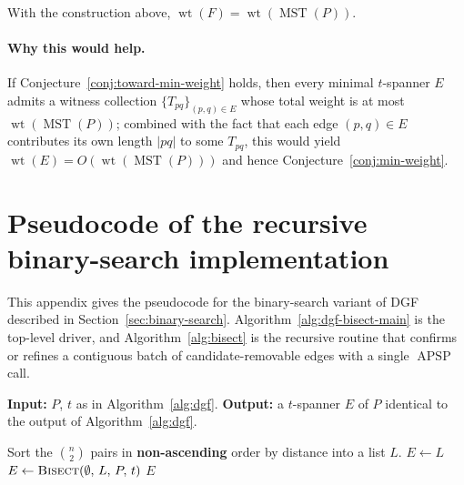 \documentclass{cccg26}
\DeclareMathOperator{\wt}{wt}
\DeclareMathOperator{\MST}{MST}
\DeclareMathOperator{\APSP}{APSP}
\begin{document}
\begin{conj}
\label{conj:toward-min-weight}
With the construction above, $\wt(F) = \wt(\MST(P))$.
\end{conj}

\paragraph{Why this would help.}
If Conjecture~\ref{conj:toward-min-weight} holds, then every minimal
$t$-spanner $E$ admits a witness collection $\{T_{pq}\}_{(p,q)\in E}$
whose total weight is at most $\wt(\MST(P))$; combined with the fact
that each edge $(p,q)\in E$ contributes its own length $|pq|$ to some
$T_{pq}$, this would yield $\wt(E) = O(\wt(\MST(P)))$ and hence
Conjecture~\ref{conj:min-weight}.


\section{Pseudocode of the recursive binary-search implementation}
\label{app:bisect-pseudocode}

This appendix gives the pseudocode for the binary-search variant of
DGF described in Section~\ref{sec:binary-search}.
Algorithm~\ref{alg:dgf-bisect-main} is the top-level driver, and
Algorithm~\ref{alg:bisect} is the recursive routine that confirms or
refines a contiguous batch of candidate-removable edges with a single
$\APSP$ call.

\begin{algorithm}[h]
\caption{DGF with recursive binary search}
\label{alg:dgf-bisect-main}
\begin{algorithmic}[1]
\Statex \textbf{Input:} $P$, $t$ as in Algorithm~\ref{alg:dgf}.
\Statex \textbf{Output:} a $t$-spanner $E$ of $P$ identical to the output of Algorithm~\ref{alg:dgf}.

\State Sort the $\binom{n}{2}$ pairs in \textbf{non-ascending} order by distance into a list $L$.
\State $E \leftarrow L$
\State $E \leftarrow \textsc{Bisect}(\emptyset,\, L,\, P,\, t)$
\State \Return $E$
\end{algorithmic}
\end{algorithm}
\end{document}
